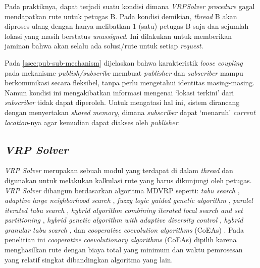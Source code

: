 Pada praktiknya, dapat terjadi suatu kondisi dimana \textit{VRPSolver procedure} gagal mendapatkan rute untuk petugas B. Pada kondisi demikian, \textit{thread} B akan diproses ulang dengan hanya melibatkan 1 (satu) petugas B saja dan sejumlah lokasi yang masih berstatus \textit{unassigned}. Ini dilakukan untuk memberikan jaminan bahwa akan selalu ada solusi/rute untuk setiap \textit{request}. 


Pada \autoref{ssec:pub-sub-mechanism} dijelaskan bahwa karakteristik \textit{loose coupling} pada mekanisme \textit{publish/subscribe} membuat \textit{publisher} dan \textit{subscriber} mampu berkomunikasi secara fleksibel, tanpa perlu mengetahui identitas masing-masing. Namun kondisi ini mengakibatkan informasi mengenai `lokasi terkini' dari \textit{subscriber} tidak dapat diperoleh. Untuk mengatasi hal ini, sistem dirancang dengan menyertakan \textit{shared memory}, dimana \textit{subscriber} dapat `menaruh' \textit{current location}-nya agar kemudian dapat  diakses oleh \textit{publisher}. 


%
%


\subsection{\textit{VRP Solver}}
\label{ssec:vrp-solver}
\textit{VRP Solver} merupakan sebuah modul yang terdapat di dalam \textit{thread} dan digunakan untuk melakukan kalkulasi rute yang harus dikunjungi oleh petugas. \textit{VRP Solver} dibangun berdasarkan algoritma MDVRP seperti: \textit{tabu search} \cite{cordeau_tabu_1997}, \textit{adaptive large neighborhood search}  \citep{pisinger_general_2007}, \textit{fuzzy logic guided genetic algorithm} \citep{lau_application_2010}, \textit{paralel iterated tabu search} \citep{cordeau_parallel_2012}, \textit{hybrid algorithm combining iterated local search and set partitioning} \citep{subramanian_hybrid_2013}, \textit{hybrid genetic algorithm with adaptive diversity control} \citep{vidal_implicit_2014}, \textit{hybrid granular tabu search} \citep{escobar_hybrid_2014}, dan \textit{cooperative coevolution algorithms} (CoEAs) \citep{de_oliveira_cooperative_2016}. Pada penelitian ini \textit{cooperative coevolutionary algorithms} (CoEAs) dipilih karena menghasilkan rute dengan biaya total yang minimum dan waktu pemrosesan yang relatif singkat dibandingkan algoritma yang lain.


